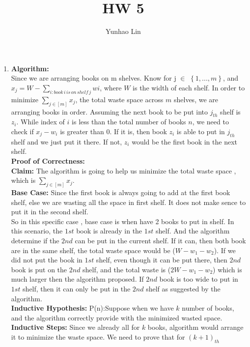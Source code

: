 \documentclass[14pt]{article}
\title{HW 5}
\author{Yunhao Lin}
\begin{document}
\maketitle

\begin{enumerate}
    \item
    \textbf{Algorithm:}\\
    Since we are arranging books on m shelves. Know for j $\in$
    $\left\{ 1,...,m \right\}$, and $x_j = W- \sum_{i: book\, i\, is\, on\, shelf\,
    j}wi$, where $W$ is the width of each shelf. In order to minimize 
    $\sum_{j \in [m]}x_j$, the total waste space across $m$ shelves, we are arranging
    books in order. Assuming the next book to be put into $j_{th}$ shelf is $z_i$.
    While index of $i$ is less than the total number of books $n$, we 
    need to check if $x_j - w_i$ is greater than 0. If it is, then book $z_i$ is 
    able to put in $j_{th}$ shelf and we just put it there. If not, $z_i$ would
    be the first book in the next shelf.\\
    \textbf{Proof of Correctness:}\\
    \textbf{Claim:} The algorithm is going to help us minimize the total waste space
    , which is $\sum_{j \in [m]}x_j$.\\
    \textbf{Base Case:} Since the first book is always going to add at the first 
    book shelf, else we are wasting all the space in first shelf. It does not make
    sence to put it in the second shelf. \\So in this specific case , base case is 
    when have 2 books to put in shelf. In this scenario, the $1st$ book is already
    in the $1st$ shelf. And the algorithm determine if the $2nd$ can be put in the
    current shelf. If it can, then both book are in the same shelf, the total waste
    space would be ($W - w_1 - w_2$). If we did not put the book in $1st$ shelf,
    even though it can be put there, then $2nd$ book is put on the $2nd$ shelf,
    and the total waste is ($2W-w_1-w_2$) which is much larger then the algorithm 
    proposed. If $2nd$ book is too wide to put in $1st$ shelf, then it can only be
    put in the $2nd$ shelf as suggested by the algorithm.\\
    \textbf{Inductive Hypothesis:} P(n):Suppose when we have $k$ number of books, and
    the algorithm correctly provide with the minimized wasted space.\\
    \textbf{Inductive Steps:} Since we already all for $k$ books, algorithm
    would arrange it to minimize the waste space. We need to prove that for $(k+1)_{th}$

\end{enumerate}
\end{document}
